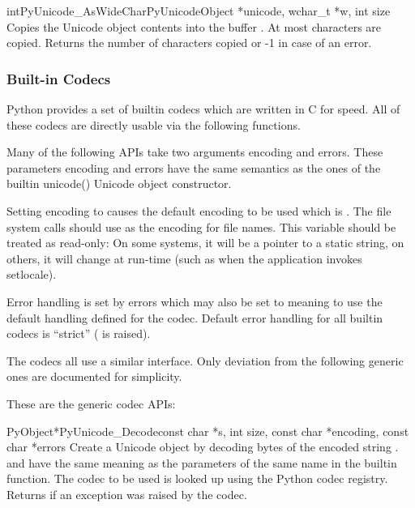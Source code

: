 \begin{cfuncdesc}{int}{PyUnicode_AsWideChar}{PyUnicodeObject *unicode,
                                             wchar_t *w,
                                             int size}
  Copies the Unicode object contents into the  buffer
  .  At most   characters are copied.
  Returns the number of  characters copied or -1 in
  case of an error.
\end{cfuncdesc}


\subsubsection{Built-in Codecs \label{builtinCodecs}}

Python provides a set of builtin codecs which are written in C
for speed. All of these codecs are directly usable via the
following functions.

Many of the following APIs take two arguments encoding and
errors. These parameters encoding and errors have the same semantics
as the ones of the builtin unicode() Unicode object constructor.

Setting encoding to \NULL{} causes the default encoding to be used
which is \ASCII.  The file system calls should use
 as the encoding for file
names. This variable should be treated as read-only: On some systems,
it will be a pointer to a static string, on others, it will change at
run-time (such as when the application invokes setlocale).

Error handling is set by errors which may also be set to \NULL{}
meaning to use the default handling defined for the codec.  Default
error handling for all builtin codecs is ``strict''
( is raised).

The codecs all use a similar interface.  Only deviation from the
following generic ones are documented for simplicity.


These are the generic codec APIs:

\begin{cfuncdesc}{PyObject*}{PyUnicode_Decode}{const char *s,
                                               int size,
                                               const char *encoding,
                                               const char *errors}
  Create a Unicode object by decoding  bytes of the encoded
  string .   and  have the same
  meaning as the parameters of the same name in the
   builtin function.  The codec to be used is
  looked up using the Python codec registry.  Returns \NULL{} if an
  exception was raised by the codec.
\end{cfuncdesc}

